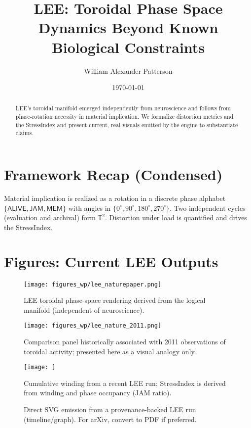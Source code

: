\documentclass[12pt]{article}
\title{LEE: Toroidal Phase Space Dynamics Beyond Known Biological Constraints}
\author{William Alexander Patterson}
\date{\today}
\begin{document}
\maketitle

\begin{abstract}
LEE’s toroidal manifold emerged independently from neuroscience and follows from phase-rotation necessity in material implication. 
We formalize distortion metrics and the StressIndex and present current, real visuals emitted by the engine to substantiate claims.
\end{abstract}

\section{Framework Recap (Condensed)}
Material implication is realized as a rotation in a discrete phase alphabet $\{\textsf{ALIVE},\textsf{JAM},\textsf{MEM}\}$ with angles in $\{0^\circ,90^\circ,180^\circ,270^\circ\}$. 
Two independent cycles (evaluation and archival) form $\mathbb{T}^2$. Distortion under load is quantified and drives the StressIndex.

\section{Figures: Current LEE Outputs}
\begin{figure}[H]\centering
\texttt{[image: figures\_wp/lee\_naturepaper.png]}
\caption{LEE toroidal phase-space rendering derived from the logical manifold (independent of neuroscience).}
\label{fig:lee-toroidal}
\end{figure}

\begin{figure}[H]\centering
\texttt{[image: figures\_wp/lee\_nature\_2011.png]}
\caption{Comparison panel historically associated with 2011 observations of toroidal activity; presented here as a visual analogy only.}
\label{fig:lee-nature-analogy}
\end{figure}

\begin{figure}[H]\centering
\texttt{[image: ]}
\caption{Cumulative winding from a recent LEE run; StressIndex is derived from winding and phase occupancy (JAM ratio).}
\label{fig:stressindex-winding}
\end{figure}

\begin{figure}[H]\centering

\caption{Direct SVG emission from a provenance-backed LEE run (timeline/graph). For arXiv, convert to PDF if preferred.}
\label{fig:lee-svg}
\end{figure}
\end{document}
